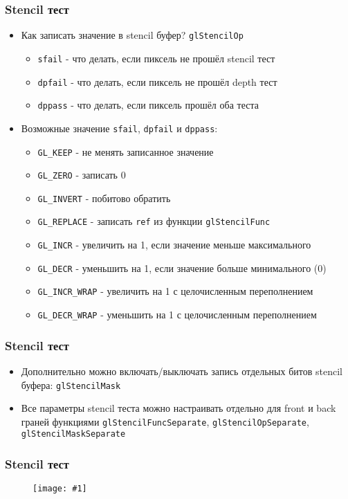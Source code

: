 \documentclass{beamer}
\newcommand{\slideimage}[1]{
  \begin{figure}
    \begin{adjustbox}{width=\textwidth, totalheight=\textheight-2\baselineskip-2\baselineskip,keepaspectratio}
      \texttt{[image: \#1]}
    \end{adjustbox}
  \end{figure}
}
\begin{document}
\begin{frame}[fragile]
\frametitle{Stencil тест}
\begin{itemize}
\item Как записать значение в stencil буфер? \pause \verb|glStencilOp|
\begin{itemize}
\item \verb|sfail| - что делать, если пиксель не прошёл stencil тест
\item \verb|dpfail| - что делать, если пиксель не прошёл depth тест
\item \verb|dppass| - что делать, если пиксель прошёл оба теста
\end{itemize}
\pause
\item Возможные значение \verb|sfail|, \verb|dpfail| и \verb|dppass|:
\begin{itemize}
\item \verb|GL_KEEP| - не менять записанное значение
\item \verb|GL_ZERO| - записать 0
\item \verb|GL_INVERT| - побитово обратить
\item \verb|GL_REPLACE| - записать \verb|ref| из функции \verb|glStencilFunc|
\item \verb|GL_INCR| - увеличить на 1, если значение меньше максимального
\item \verb|GL_DECR| - уменьшить на 1, если значение больше минимального (0)
\item \verb|GL_INCR_WRAP| - увеличить на 1 с целочисленным переполнением
\item \verb|GL_DECR_WRAP| - уменьшить на 1 с целочисленным переполнением
\end{itemize}
\end{itemize}
\end{frame}

\begin{frame}[fragile]
\frametitle{Stencil тест}
\begin{itemize}
\item Дополнительно можно включать/выключать запись отдельных битов stencil буфера: \verb|glStencilMask|
\pause
\item Все параметры stencil теста можно настраивать отдельно для front и back граней функциями \verb|glStencilFuncSeparate|, \verb|glStencilOpSeparate|, \verb|glStencilMaskSeparate|
\end{itemize}
\end{frame}

\begin{frame}[fragile]
\frametitle{Stencil тест}
\slideimage{stencil-example-1.png}
\end{frame}
\end{document}
